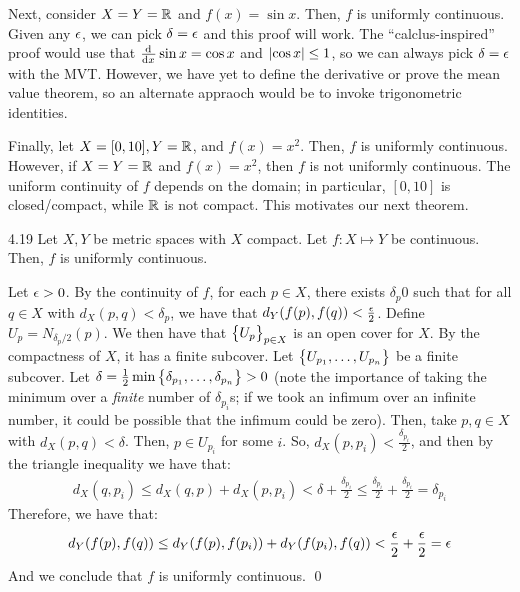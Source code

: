 Next, consider $X = Y = \mathbb{R}$ and $f(x) = \sin x$. Then, $f$ is uniformly continuous. Given any $\epsilon$, we can pick $\delta = \epsilon$ and this proof will work. The ``calclus-inspired'' proof would use that $\od{}{x}\sin x = \cos x$ and $\abs{\cos x} \leq 1$, so we can always pick $\delta = \epsilon$ with the MVT. However, we have yet to define the derivative or prove the mean value theorem, so an alternate appraoch would be to invoke trigonometric identities.

Finally, let $X = [0, 10], Y = \mathbb{R}$, and $f(x) = x^2$. Then, $f$ is uniformly continuous. However, if $X = Y = \mathbb{R}$ and $f(x) = x^2$, then $f$ is not uniformly continuous. The uniform continuity of $f$ depends on the domain; in particular, $[0, 10]$ is closed/compact, while $\mathbb{R}$ is not compact. This motivates our next theorem.

\begin{theorem}{}{4.19}
    Let $X, Y$ be metric spaces with $X$ compact. Let $f: X \mapsto Y$ be continuous. Then, $f$ is uniformly continuous.
\end{theorem}
\begin{nproof}
    Let $\epsilon > 0$. By the continuity of $f$, for each $p \in X$, there exists $\delta_p  0$ such that for all $q \in X$ with $d_X(p, q)  <\delta_p$, we have that $d_Y(f(p), f(q)) < \frac{\epsilon}{2}$. Define $U_p = N_{\delta_p/2}(p)$. We then have that $\set{U_p}_{p \in X}$ is an open cover for $X$. By the compactness of $X$, it has a finite subcover. Let $\set{U_{p_1}, \ldots, U_{p_n}}$ be a finite subcover. Let $\delta = \frac{1}{2}\min\set{\delta_{p_1}, \ldots, \delta_{p_n}} > 0$ (note the importance of taking the minimum over a \textit{finite} number of $\delta_{p_i}$s; if we took an infimum over an infinite number, it could be possible that the infimum could be zero). Then, take $p, q \in X$ with $d_X(p, q) < \delta$. Then, $p \in U_{p_i}$ for some $i$. So, $d_X(p, p_i) < \frac{\delta_{p_i}}{2}$, and then by the triangle inequality we have that:
    \begin{align*}
        d_X(q, p_i) \leq d_X(q, p) + d_X(p, p_i) < \delta + \frac{\delta_{p_i}}{2} \leq \frac{\delta_{p_i}}{2} + \frac{\delta_{p_i}}{2} = \delta_{p_i}
    \end{align*} 
    Therefore, we have that:
    \begin{align*}
        d_Y(f(p), f(q)) \leq d_Y(f(p), f(p_i)) + d_Y(f(p_i), f(q)) < \frac{\epsilon}{2} + \frac{\epsilon}{2} = \epsilon
    \end{align*}
    And we conclude that $f$ is uniformly continuous. \qed
\end{nproof}

